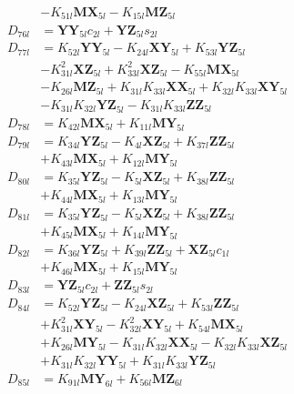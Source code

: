 \begin{multicols}{2}
\begin{align}
&- K_{51l}\mathbf{MX}_{5l} - K_{15l}\mathbf{MZ}_{5l} \nonumber \\
D_{76l} &= \mathbf{YY}_{5l}c_{2l} + \mathbf{YZ}_{5l}s_{2l} \nonumber \\
D_{77l} &= K_{52l}\mathbf{YY}_{5l} - K_{24l}\mathbf{XY}_{5l} + K_{53l}\mathbf{YZ}_{5l}  \nonumber \\
&- K_{31l}^2\mathbf{XZ}_{5l} + K_{33l}^2\mathbf{XZ}_{5l} - K_{55l}\mathbf{MX}_{5l}  \nonumber \\
&- K_{26l}\mathbf{MZ}_{5l} + K_{31l}K_{33l}\mathbf{XX}_{5l} + K_{32l}K_{33l}\mathbf{XY}_{5l}  \nonumber \\
&- K_{31l}K_{32l}\mathbf{YZ}_{5l} - K_{31l}K_{33l}\mathbf{ZZ}_{5l} \nonumber \\
D_{78l} &= K_{42l}\mathbf{MX}_{5l} + K_{11l}\mathbf{MY}_{5l} \nonumber \\
D_{79l} &= K_{34l}\mathbf{YZ}_{5l} - K_{4l}\mathbf{XZ}_{5l} + K_{37l}\mathbf{ZZ}_{5l}  \nonumber \\
&+ K_{43l}\mathbf{MX}_{5l} + K_{12l}\mathbf{MY}_{5l} \nonumber \\
D_{80l} &= K_{35l}\mathbf{YZ}_{5l} - K_{5l}\mathbf{XZ}_{5l} + K_{38l}\mathbf{ZZ}_{5l}  \nonumber \\
&+ K_{44l}\mathbf{MX}_{5l} + K_{13l}\mathbf{MY}_{5l} \nonumber \\
D_{81l} &= K_{35l}\mathbf{YZ}_{5l} - K_{5l}\mathbf{XZ}_{5l} + K_{38l}\mathbf{ZZ}_{5l}  \nonumber \\
&+ K_{45l}\mathbf{MX}_{5l} + K_{14l}\mathbf{MY}_{5l} \nonumber \\
D_{82l} &= K_{36l}\mathbf{YZ}_{5l} + K_{39l}\mathbf{ZZ}_{5l} + \mathbf{XZ}_{5l}c_{1l}  \nonumber \\
&+ K_{46l}\mathbf{MX}_{5l} + K_{15l}\mathbf{MY}_{5l} \nonumber \\
D_{83l} &= \mathbf{YZ}_{5l}c_{2l} + \mathbf{ZZ}_{5l}s_{2l} \nonumber \\
D_{84l} &= K_{52l}\mathbf{YZ}_{5l} - K_{24l}\mathbf{XZ}_{5l} + K_{53l}\mathbf{ZZ}_{5l}  \nonumber \\
&+ K_{31l}^2\mathbf{XY}_{5l} - K_{32l}^2\mathbf{XY}_{5l} + K_{54l}\mathbf{MX}_{5l}  \nonumber \\
&+ K_{26l}\mathbf{MY}_{5l} - K_{31l}K_{32l}\mathbf{XX}_{5l} - K_{32l}K_{33l}\mathbf{XZ}_{5l}  \nonumber \\
&+ K_{31l}K_{32l}\mathbf{YY}_{5l} + K_{31l}K_{33l}\mathbf{YZ}_{5l} \nonumber \\
D_{85l} &= K_{91l}\mathbf{MY}_{6l} + K_{56l}\mathbf{MZ}_{6l} \nonumber \\

\end{align}
\end{multicols}
